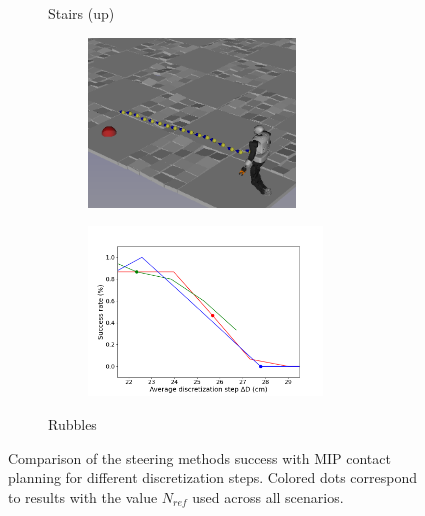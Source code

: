 \begin{figure}[h!]
\begin{subfigure}{0.9\linewidth}
\begin{subfigure}{0.48\linewidth}
        \end{subfigure}
        \caption{Stairs (up)}
        \label{fig:mip:minimizing_basic:0}
    \end{subfigure}
    \begin{subfigure}{0.9\linewidth}
        \centering
        \begin{subfigure}{0.48\linewidth}
            \includegraphics[trim={0cm 0cm 0cm 0cm},clip,width=\textwidth,height=4.5cm]{Figures/Chapter_MIP_SL1M/res_mip/scenario_rubbles.png}
        \end{subfigure}
        \begin{subfigure}{0.48\linewidth}
            \includegraphics[trim={0cm 0cm 2cm 1.8cm}, clip,width=\textwidth,height=4.5cm]{Figures/Chapter_MIP_SL1M/res_mip/MIP_res_rubbles/FIGURE_MIP_RUBBLES_2.png}
        \end{subfigure}
        \caption{Rubbles}
        \label{fig:mip:minimizing_basic:1}
    \end{subfigure}
    \caption{Comparison of the steering methods success with MIP contact planning for different discretization steps. Colored dots correspond to results with the value $N_{ref}$ used across all scenarios.}
    \label{fig:mip:minimizing_basic}
\end{figure}
